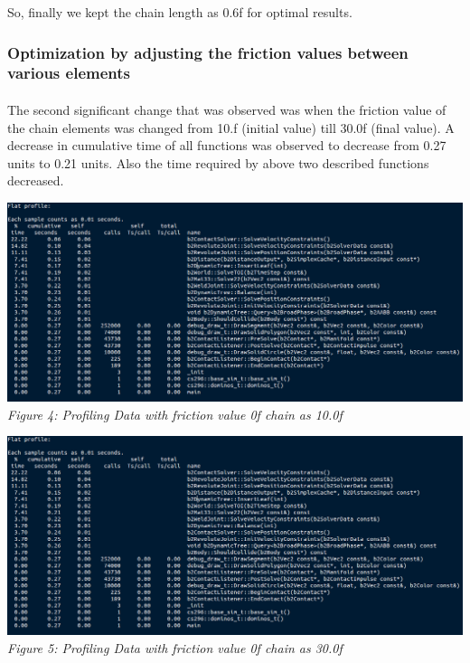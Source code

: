 \documentclass[11pt]{article}
\begin{document}
	So, finally we kept the chain length as 0.6f for optimal results.

\subsubsection{Optimization by adjusting the friction values between various elements}

\paragraph{}
The second significant change that was observed was when the friction value of the chain elements was changed from 10.f (initial value) 
till 30.0f (final value). A decrease in cumulative time of all functions was observed to decrease from 0.27 units to 0.21 units. 
Also the time required by above two described functions decreased.

\begin{center}
 \includegraphics[scale = 0.4]{images/friction10} \\
  \emph{Figure 4: Profiling Data with friction value 0f chain as 10.0f} \\
\end{center}

\begin{center}
 \includegraphics[scale = 0.4]{images/friction10} \\
  \emph{Figure 5: Profiling Data with friction value 0f chain as 30.0f} \\
\end{center}
\end{document}
